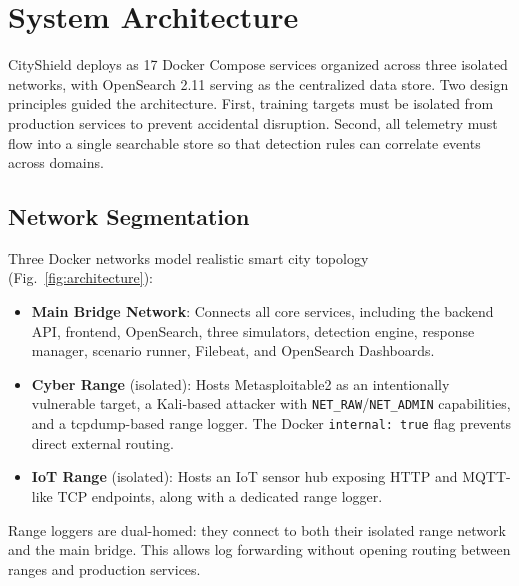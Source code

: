 \documentclass[conference,10pt]{IEEEtran}
\begin{document}
\section{System Architecture}
\label{sec:architecture}

CityShield deploys as 17 Docker Compose services organized across three isolated networks, with OpenSearch 2.11 serving as the centralized data store. Two design principles guided the architecture. First, training targets must be isolated from production services to prevent accidental disruption. Second, all telemetry must flow into a single searchable store so that detection rules can correlate events across domains.

\subsection{Network Segmentation}

Three Docker networks model realistic smart city topology (Fig.~\ref{fig:architecture}):

\begin{itemize}[leftmargin=*]
    \item \textbf{Main Bridge Network}: Connects all core services, including the backend API, frontend, OpenSearch, three simulators, detection engine, response manager, scenario runner, Filebeat, and OpenSearch Dashboards.
    \item \textbf{Cyber Range} (isolated): Hosts Metasploitable2 as an intentionally vulnerable target, a Kali-based attacker with \texttt{NET\_RAW}/\texttt{NET\_ADMIN} capabilities, and a tcpdump-based range logger. The Docker \texttt{internal: true} flag prevents direct external routing.
    \item \textbf{IoT Range} (isolated): Hosts an IoT sensor hub exposing HTTP and MQTT-like TCP endpoints, along with a dedicated range logger.
\end{itemize}

Range loggers are dual-homed: they connect to both their isolated range network and the main bridge. This allows log forwarding without opening routing between ranges and production services.
\end{document}
